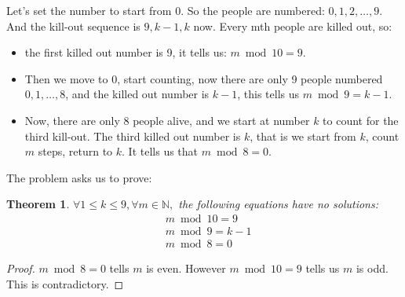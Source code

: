 \documentclass{article}
\newtheorem{theorem}{Theorem}[section]
\begin{document}
Let's set the number to start from 0. So the people are numbered: $0, 1, 2, \dots, 9$. And the kill-out sequence is $9,k-1,k$ now. Every mth people are killed out, so:
\begin{itemize}
    \item the first killed out number is 9, it tells us: $m \bmod 10 = 9$.
    \item Then we move to $0$, start counting, now there are only 9 people numbered $0,1,\dots,8$, and the killed out number is $k-1$, this tells us $m \bmod 9 = k-1$.
    \item Now, there are only 8 people alive, and we start at number $k$ to count for the third kill-out. The third killed out number is $k$, that is we start from $k$, count $m$ steps, return to $k$. It tells us that $m \bmod 8 = 0$.
\end{itemize}

The problem asks us to prove:
\begin{theorem}
   $\forall 1 \le k \le 9, \forall m \in \mathbb{N},$ the following equations have no solutions:
   \begin{equation}
       \begin{split}
           & m \bmod 10 = 9\\
           & m \bmod 9 = k - 1\\
           & m \bmod 8 = 0
       \end{split}
   \end{equation}
\end{theorem}

\begin{proof}
    $m \bmod 8 = 0$ tells $m$ is even. However $m \bmod 10=9$ tells us $m$ is odd. This is contradictory.
\end{proof}
\end{document}

